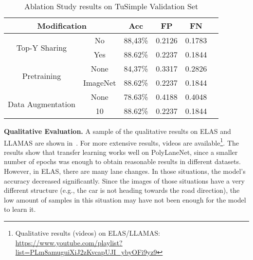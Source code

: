 \documentclass[a4paper,conference]{IEEEtran}
\newcommand{\methodname}{PolyLaneNet}
\begin{document}
\begin{table}[h]
	\centering
	\caption{Ablation Study results on TuSimple Validation Set}
	\label{tab:ablation-study-others}
	\begin{tabular}{@{}ccllll@{}}
		\toprule
		\multicolumn{2}{c}{\textbf{Modification}} & \multicolumn{1}{c}{\textbf{Acc}} & \multicolumn{1}{c}{\textbf{FP}} & \multicolumn{1}{c}{\textbf{FN}}\\ \midrule
		\multirow{2}{*}{Top-Y Sharing}     & No              & 88,43\%  & 0.2126 & 0.1783 \\
		                                   & Yes             & 88.62\%  & 0.2237 & 0.1844 \\ \midrule
		\multirow{2}{*}{Pretraining}       & None            & 84,37\%  & 0.3317 & 0.2826 \\
		                                   & ImageNet        & 88.62\%  & 0.2237 & 0.1844 \\ \midrule
		\multirow{3}{*}{Data Augmentation} & None            & 78.63\%  & 0.4188 & 0.4048 \\
		                                   & 10      & 88.62\%  & 0.2237 & 0.1844 \\ \bottomrule
	\end{tabular}
\end{table} 
\begin{figure*}[t]
	\centering
	
	\caption{Qualitative results of \methodname{} on ELAS (top row) and LLAMAS (bottom row).}
	\label{fig:qualitative-elas-llamas}
\end{figure*}

\textbf{Qualitative Evaluation.} A sample of the qualitative results on ELAS and LLAMAS are shown in~. For more extensive results, videos are available\footnote{Qualitative results (videos) on ELAS/LLAMAS: \url{https://www.youtube.com/playlist?list=PLm8amuguiXiJ2zKvcapUJI_ybyOFi9yz9}}. The results show that transfer learning works well on \methodname{}, since a smaller number of epochs was enough to obtain reasonable results in different datasets. However, in ELAS, there are many lane changes. In those situations, the model's accuracy decreased significantly. Since the images of those situations have a very different structure (e.g., the car is not heading towards the road direction), the low amount of samples in this situation may have not been enough for the model to learn it.
\end{document}
